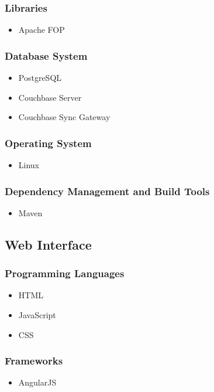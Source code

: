 \documentclass[a4paper,10pt]{article}
\begin{document}
\subsubsection{Libraries}
	\begin{itemize}
		\item Apache FOP

	\end{itemize}

\subsubsection{Database System}
	\begin{itemize}
		\item PostgreSQL
		\item Couchbase Server
		\item Couchbase Sync Gateway
	\end{itemize}

\subsubsection{Operating System}
	\begin{itemize}
		\item Linux
	\end{itemize}

\subsubsection{Dependency Management and Build Tools}
	\begin{itemize}
		\item Maven
	\end{itemize}

\subsection{Web Interface}
\subsubsection{Programming Languages}
	\begin{itemize}
		\item HTML
		\item JavaScript
		\item CSS
	\end{itemize}

\subsubsection{Frameworks}
	\begin{itemize}
		\item AngularJS
	\end{itemize}
\end{document}
